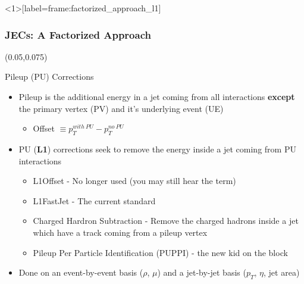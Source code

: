 \begin{frame}<1>[label=frame:factorized_approach_l1]
	\frametitle{JECs: A Factorized Approach}
	\begin{textblock}{.9}(0.05,0.075) %
		\begin{figure}
			\label{fig:factorized_approach_l1}
		\end{figure}
	\end{textblock}
	\vspace*{2.2cm}
	\begin{block}{Pileup (PU) Corrections}
		\begin{itemize}
			\footnotesize
			\item Pileup is the additional energy in a jet coming from all interactions \textbf{except} the primary vertex (PV) and it's underlying event (UE)
                          \begin{itemize}
                                \footnotesize
                                \item {\color{RedOrange} Offset} $\equiv p_{T}^{with\ PU} - p_{T}^{no\ PU}$
                        \end{itemize}
			\item PU (\textbf{L1}) corrections seek to remove the energy inside a jet coming from PU interactions
			\begin{itemize}
				\footnotesize
				\item L1Offset - No longer used (you may still hear the term)
				\item L1FastJet - The current standard
				\item Charged Hardron Subtraction - Remove the charged hadrons inside a jet which have a track coming from a pileup vertex
				\item Pileup Per Particle Identification (PUPPI) - the new kid on the block 
			\end{itemize}
			\item Done on an {\color{blue}event-by-event} basis ($\rho$, $\mu$) and a {\color{red}jet-by-jet} basis ($p_{T}$, $\eta$, jet area)

\end{itemize}
\end{block}
\end{frame}
